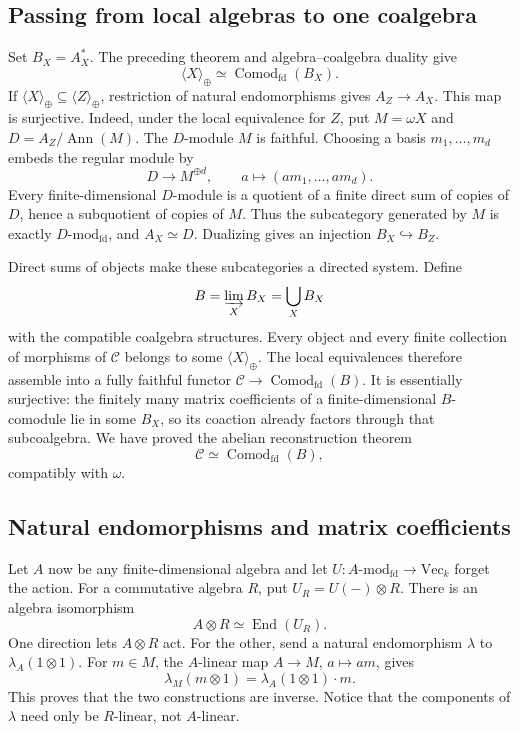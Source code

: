 \subsection*{Passing from local algebras to one coalgebra}
Set $B_X=A_X^*$. The preceding theorem and algebra--coalgebra duality give
\[
 \langle X\rangle_{\oplus}\simeq\operatorname{Comod}_{\mathrm{fd}}(B_X).
\]
If $\langle X\rangle_{\oplus}\subseteq\langle Z\rangle_{\oplus}$, restriction of natural endomorphisms gives $A_Z\to A_X$. This map is surjective. Indeed, under the local equivalence for $Z$, put $M=\omega X$ and $D=A_Z/\operatorname{Ann}(M)$. The $D$-module $M$ is faithful. Choosing a basis $m_1,\ldots,m_d$ embeds the regular module by
\[
 D\longrightarrow M^{\oplus d},\qquad a\longmapsto(am_1,\ldots,am_d).
\]
Every finite-dimensional $D$-module is a quotient of a finite direct sum of copies of $D$, hence a subquotient of copies of $M$. Thus the subcategory generated by $M$ is exactly $D\text{-}\mathrm{mod}_{\mathrm{fd}}$, and $A_X\simeq D$. Dualizing gives an injection $B_X\hookrightarrow B_Z$.

Direct sums of objects make these subcategories a directed system. Define
\[
 B=\varinjlim_X B_X=\bigcup_X B_X
\]
with the compatible coalgebra structures. Every object and every finite collection of morphisms of $\mathcal C$ belongs to some $\langle X\rangle_{\oplus}$. The local equivalences therefore assemble into a fully faithful functor $\mathcal C\to\operatorname{Comod}_{\mathrm{fd}}(B)$. It is essentially surjective: the finitely many matrix coefficients of a finite-dimensional $B$-comodule lie in some $B_X$, so its coaction already factors through that subcoalgebra. We have proved the abelian reconstruction theorem
\begin{equation}\label{eq:abelian-reconstruction}
 \mathcal C\simeq\operatorname{Comod}_{\mathrm{fd}}(B),
\end{equation}
compatibly with $\omega$.

\subsection*{Natural endomorphisms and matrix coefficients}
Let $A$ now be any finite-dimensional algebra and let $U:A\text{-}\mathrm{mod}_{\mathrm{fd}}\to\mathrm{Vec}_k$ forget the action. For a commutative algebra $R$, put $U_R=U(-)\otimes R$. There is an algebra isomorphism
\[
 A\otimes R\simeq\operatorname{End}(U_R).
\]
One direction lets $A\otimes R$ act. For the other, send a natural endomorphism $\lambda$ to $\lambda_A(1\otimes1)$. For $m\in M$, the $A$-linear map $A\to M$, $a\mapsto am$, gives
\[
 \lambda_M(m\otimes1)=\lambda_A(1\otimes1)\cdot m.
\]
This proves that the two constructions are inverse. Notice that the components of $\lambda$ need only be $R$-linear, not $A$-linear.

